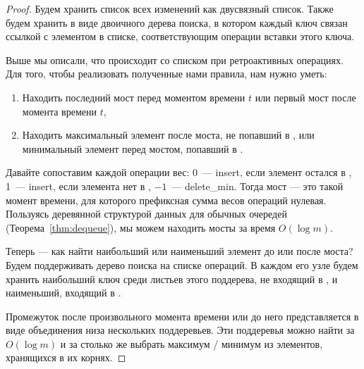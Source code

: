 \begin{proof}
	Будем хранить список всех изменений как двусвязный список. Также будем хранить \qnow в виде двоичного дерева поиска, в котором каждый ключ связан ссылкой с элементом в списке, соответствующим операции вставки этого ключа.

	Выше мы описали, что происходит со списком при ретроактивных операциях. Для того, чтобы реализовать полученные нами правила, нам нужно уметь:
     \begin{enumerate}
	\item Находить последний мост перед моментом времени $t$ или первый мост после момента времени $t$,
	\item Находить максимальный элемент после моста, не попавший в \qnow, или минимальный элемент перед мостом, попавший в \qnow.
     \end{enumerate}

	Давайте сопоставим каждой операции вес: 0~— insert, если элемент остался в \qnow, 1~— insert, если элемента нет в \qnow, $-1$~— delete\_min. Тогда мост — это такой момент времени, для которого префиксная сумма весов операций нулевая. Пользуясь деревянной структурой данных для обычных очередей (Теорема~\ref{thm:dequeue}), мы можем находить мосты за время $O(\log m)$.

	Теперь — как найти наибольший или наименьший элемент до или после моста? Будем поддерживать дерево поиска на списке операций. В каждом его узле будем хранить наибольший ключ среди листьев этого поддерева, не входящий в \qnow, и наименьший, входящий в \qnow.

	Промежуток после произвольного момента времени или до него представляется в виде объединения низа нескольких поддеревьев. Эти поддеревья можно найти за $O(\log m)$ и за столько же выбрать максимум / минимум из элементов, хранящихся в их корнях.
\end{proof}
